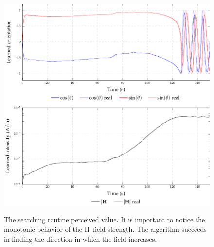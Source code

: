 \begin{figure}[f]
	\centering
	\includegraphics[]{ch4/tikz/Searching.pdf}
\label{fig:searching}
\caption{The searching routine perceived value. It is important to notice the monotonic behavior of the H--field strength. The algorithm succeeds in finding the direction in which the field increases.}
\end{figure}

